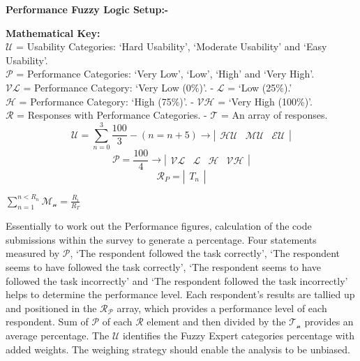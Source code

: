 \documentclass[12pt]{report} %
\begin{document}
	\textbf{Performance Fuzzy Logic Setup:-}
	\begin{center}
		\textbf{Mathematical Key: }\\
		$\mathcal{U}$ = Usability Categories: `Hard Usability', `Moderate Usability' and `Easy Usability'.\\
		$\mathcal{P}$ = Performance Categories: `Very Low', `Low', `High' and `Very High'.\\
		$\mathcal{VL}$ = Performance Category: `Very Low (0\%)'. - $\mathcal{L}$ = `Low (25\%).'\\
		$\mathcal{H}$ = Performance Category: `High (75\%)'. - $\mathcal{VH}$ = `Very High (100\%)'.\\
		$\mathcal{R}$ = Responses with Performance Categories. - $\mathcal{T}$ = An array of responses.\\

		\[\mathcal{U} = \sum_{n = 0}^{3} \frac{100}{3} - (n = n + 5) \rightarrow \left|
			\begin{array}{ccc}
				\mathcal{HU} & \mathcal{MU} & \mathcal{EU}
			\end{array} \right|
		\]
		\[\mathcal{P} = \frac{100}{4} \rightarrow \left|
			\begin{array}{cccc}
				\mathcal{VL} & \mathcal{L} & \mathcal{H} & \mathcal{VH}
			\end{array} \right|
		\]
		\[ \mathcal{R}_{P} = \left| 
			\begin{array}{c}
				T_{n}
			\end{array}
		 \right|
		\]

		$\sum_{n = 1}^{n < R_{n}} \mathcal{M_{n}} = \frac{R_{i}}{R_{T}}$
	\end{center}
		
	Essentially to work out the Performance figures, calculation of the code submissions within the survey to generate a percentage. Four statements measured by $\mathcal{P}$, `The respondent followed the task correctly', `The respondent seems to have followed the task correctly', `The respondent seems to have followed the task incorrectly' and `The respondent followed the task incorrectly' helps to determine the performance level. Each respondent's results are tallied up and positioned in the $\mathcal{R_{P}}$ array, which provides a performance level of each respondent. Sum of $\mathcal{P}$ of each $\mathcal{R}$ element and then divided by the $\mathcal{T_{n}}$ provides an average percentage. The $\mathcal{U}$ identifies the Fuzzy Expert categories percentage with added weights. The weighing strategy should enable the analysis to be unbiased.
\end{document}

